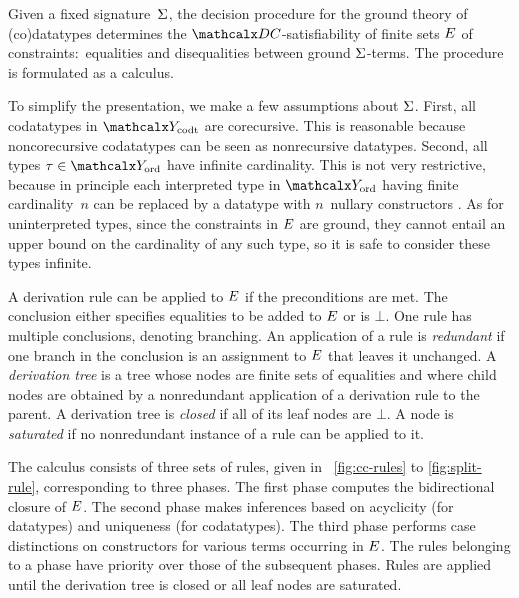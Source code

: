 Given a fixed signature~$\mathrm{\Sigma}$,
the decision procedure for the ground theory of (co)datatypes %
determines the
$\thD$-satisfiability of finite sets $E$ of constraints:\ equalities
and disequalities between ground $\mathrm{\Sigma}$-terms. The
procedure is formulated as a calculus.

To simplify the presentation, we make a few assumptions about
$\mathrm{\Sigma}$.
First, all codatatypes in $\Codata$ are corecursive. This is reasonable
because noncorecursive codatatypes can be seen as nonrecursive
datatypes.
Second, all types $\tau \in \Nondata$ have infinite cardinality.
This is not very restrictive, because in principle each interpreted type in
$\Nondata$ having finite cardinality~$n$
can be replaced by a %
datatype with $n$~nullary constructors
\cite{barrett-et-al-2007}.
As for uninterpreted types, since the constraints in $E$
are ground, they cannot entail an upper
bound on the cardinality of any such type, so it is safe to consider these types infinite.


{
A derivation rule can be applied to $E$ if %
the %
preconditions are met.
The conclusion either specifies equalities to be added to $E$
or is $\bot$. %
One rule has multiple conclusions, %
denoting branching.
%
An application of a rule is \emph{redundant} if one branch in the
conclusion is an assignment to $E$ that leaves it unchanged.
A \emph{derivation tree} is a %
tree whose nodes are finite sets of
equalities and where child nodes are obtained by a nonredundant application of a
derivation rule to the parent. A derivation tree is \emph{closed} if all of
its leaf nodes are $\bot$. A node is \emph{saturated} if no nonredundant
instance of a rule can be applied to it.

}

The calculus consists of three sets of rules, given in
\figuresname~\ref{fig:cc-rules} to \ref{fig:split-rule}, corresponding to three
phases. The first phase computes the bidirectional closure of $E$. The second
phase makes inferences based on acyclicity (for datatypes) and uniqueness
(for codatatypes).
The third phase performs case distinctions on constructors for
various terms occurring in $E$.
%
The rules belonging to a phase have priority over those of the subsequent
phases. Rules are applied until the derivation tree is closed or all leaf nodes
are saturated.

